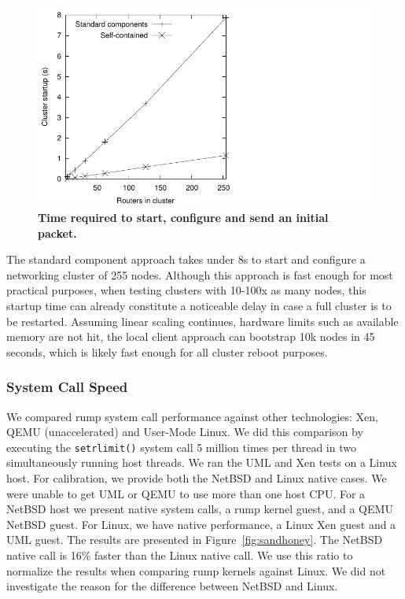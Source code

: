 \begin{figure}[t]
\includegraphics{clusterstart}
\caption[Time required to start, configure and send an initial packet]{
\textbf{Time required to start, configure and send an initial packet.}}
\label{fig:clusterstart}
\end{figure}

The standard component approach takes under 8s to start and configure
a networking cluster of 255 nodes.  Although this approach is fast enough
for most practical purposes, when testing clusters with 10-100x as
many nodes, this startup time can already constitute a noticeable delay in case
a full cluster is to be restarted.  Assuming linear scaling continues,
\ie hardware limits such as available memory are not hit, the local client approach can
bootstrap 10k nodes in 45 seconds, which is likely fast enough for
all cluster reboot purposes.

\subsubsection{System Call Speed}

We compared rump system call performance against other technologies:
Xen, QEMU (unaccelerated) and User-Mode Linux.  We did this comparison by
executing the \texttt{setrlimit()} system call 5 million times per
thread in two simultaneously running host threads.  We ran the UML
and Xen tests on a Linux host.  For calibration, we provide both
the NetBSD and Linux native cases.  We were unable to get UML or
QEMU to use more than one host CPU.  For a NetBSD host we present
native system calls, a rump kernel guest, and a QEMU NetBSD guest.
For Linux, we have native performance, a Linux Xen guest and a UML
guest.  The results are presented in Figure~\ref{fig:sandhoney}.
The NetBSD native call is 16\% faster than the Linux native call.
We use this ratio to normalize the results when comparing rump kernels
against Linux.  We did not investigate the reason for the difference
between NetBSD and Linux.

